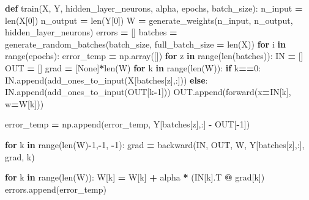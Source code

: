 \documentclass[
]{book}
\newenvironment{Shaded}{\begin{snugshade}}{\end{snugshade}}
\newcommand{\BuiltInTok}[1]{#1}
\newcommand{\ControlFlowTok}[1]{\textcolor[rgb]{0.13,0.29,0.53}{\textbf{#1}}}
\newcommand{\DecValTok}[1]{\textcolor[rgb]{0.00,0.00,0.81}{#1}}
\newcommand{\KeywordTok}[1]{\textcolor[rgb]{0.13,0.29,0.53}{\textbf{#1}}}
\newcommand{\NormalTok}[1]{#1}
\newcommand{\OperatorTok}[1]{\textcolor[rgb]{0.81,0.36,0.00}{\textbf{#1}}}
\newcommand{\VariableTok}[1]{\textcolor[rgb]{0.00,0.00,0.00}{#1}}
\begin{document}
\begin{Shaded}
\begin{Highlighting}[]
\KeywordTok{def}\NormalTok{ train(X, Y, hidden\_layer\_neurons, alpha, epochs, batch\_size):}
\NormalTok{  n\_input }\OperatorTok{=} \BuiltInTok{len}\NormalTok{(X[}\DecValTok{0}\NormalTok{])}
\NormalTok{  n\_output }\OperatorTok{=} \BuiltInTok{len}\NormalTok{(Y[}\DecValTok{0}\NormalTok{])}
\NormalTok{  W }\OperatorTok{=}\NormalTok{ generate\_weights(n\_input, n\_output, hidden\_layer\_neurons)}
\NormalTok{  errors }\OperatorTok{=}\NormalTok{ []}
\NormalTok{  batches }\OperatorTok{=}\NormalTok{ generate\_random\_batches(batch\_size, full\_batch\_size }\OperatorTok{=} \BuiltInTok{len}\NormalTok{(X))}
  \ControlFlowTok{for}\NormalTok{ i }\KeywordTok{in} \BuiltInTok{range}\NormalTok{(epochs):}
\NormalTok{    error\_temp }\OperatorTok{=}\NormalTok{ np.array([])}
    \ControlFlowTok{for}\NormalTok{ z }\KeywordTok{in} \BuiltInTok{range}\NormalTok{(}\BuiltInTok{len}\NormalTok{(batches)):}
\NormalTok{      IN }\OperatorTok{=}\NormalTok{ []}
\NormalTok{      OUT }\OperatorTok{=}\NormalTok{ []}
\NormalTok{      grad }\OperatorTok{=}\NormalTok{ [}\VariableTok{None}\NormalTok{]}\OperatorTok{*}\BuiltInTok{len}\NormalTok{(W)}
      \ControlFlowTok{for}\NormalTok{ k }\KeywordTok{in} \BuiltInTok{range}\NormalTok{(}\BuiltInTok{len}\NormalTok{(W)):}
        \ControlFlowTok{if}\NormalTok{ k}\OperatorTok{==}\DecValTok{0}\NormalTok{:}
\NormalTok{          IN.append(add\_ones\_to\_input(X[batches[z],:]))}
        \ControlFlowTok{else}\NormalTok{:}
\NormalTok{          IN.append(add\_ones\_to\_input(OUT[k}\OperatorTok{{-}}\DecValTok{1}\NormalTok{]))}
\NormalTok{        OUT.append(forward(x}\OperatorTok{=}\NormalTok{IN[k], w}\OperatorTok{=}\NormalTok{W[k]))}
        
\NormalTok{      error\_temp }\OperatorTok{=}\NormalTok{ np.append(error\_temp, Y[batches[z],:] }\OperatorTok{{-}}\NormalTok{ OUT[}\OperatorTok{{-}}\DecValTok{1}\NormalTok{])}
        
      \ControlFlowTok{for}\NormalTok{ k }\KeywordTok{in} \BuiltInTok{range}\NormalTok{(}\BuiltInTok{len}\NormalTok{(W)}\OperatorTok{{-}}\DecValTok{1}\NormalTok{,}\OperatorTok{{-}}\DecValTok{1}\NormalTok{, }\OperatorTok{{-}}\DecValTok{1}\NormalTok{):}
\NormalTok{        grad }\OperatorTok{=}\NormalTok{ backward(IN, OUT, W, Y[batches[z],:], grad, k) }
        
      \ControlFlowTok{for}\NormalTok{ k }\KeywordTok{in} \BuiltInTok{range}\NormalTok{(}\BuiltInTok{len}\NormalTok{(W)):}
\NormalTok{        W[k] }\OperatorTok{=}\NormalTok{ W[k] }\OperatorTok{+}\NormalTok{ alpha }\OperatorTok{*}\NormalTok{ (IN[k].T }\OperatorTok{@}\NormalTok{ grad[k])}
\NormalTok{    errors.append(error\_temp)}
    

\end{Highlighting}
\end{Shaded}
\end{document}
